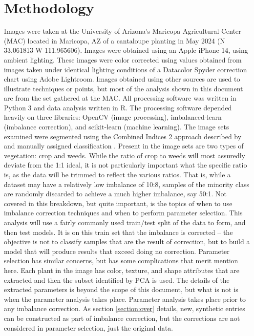 \documentclass[letterpaper]{article}
\begin{document}
\section{Methodology}
Images were taken at the University of Arizona's Maricopa Agricultural Center (MAC) located in Maricopa, AZ of a cantaloupe planting in May 2024 (N 33.061813 W 111.965606). Images were obtained using an Apple iPhone 14, using ambient lighting. These images were color corrected using values obtained from images taken under identical lighting conditions of a Datacolor Spyder correction chart using Adobe Lightroom.  Images obtained using other sources are used to illustrate techniques or points, but most of the analysis shown in this document are from the set gathered at the MAC. All processing software was written in Python 3 and data analysis written in R.  The processing software depended heavily on three libraries: OpenCV (image processing), imbalanced-learn (imbalance correction), and scikit-learn (machine learning). The image sets examined were segmented using the Combined Indices 2 approach described by \citeauthor{Guerrero2012-zi} and manually assigned classification \parencite{Guerrero2012-zi}.
Present in the image sets are two types of vegetation: crop and weeds. While the ratio of crop to weeds will most assuredly deviate from the 1:1 ideal, it is not particularly important what the specific ratio is, as the data will be trimmed to reflect the various ratios. That is, while a dataset may have a relatively low imbalance of 10:8, samples of the minority class are randomly discarded to achieve a much higher imbalance, say 50:1. Not covered in this breakdown, but quite important, is the topics of when to use imbalance correction techniques and when to perform parameter selection. This analysis will use a fairly commonly used train/test split of the data to form, and then test models. It is on this train set that the imbalance is corrected -- the objective is not to classify samples that are the result of correction, but to build a model that will produce results that exceed doing no correction. Parameter selection has similar concerns, but has some complications that merit mention here. Each plant in the image has color, texture, and shape attributes that are extracted and then the subset identified by PCA is used. The details of the extracted parameters is beyond the scope of this document, but what is not is when the parameter analysis takes place. Parameter analysis takes place prior to any imbalance correction.  As section \ref{section:over} details, new, synthetic entries can be constructed as part of imbalance correction, but the corrections are not considered in parameter selection, just the original data.
\end{document}
